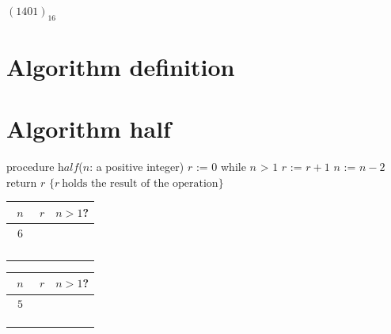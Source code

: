 \documentclass[12pt, oneside]{article}
\begin{document}
\vfill
\vfill
\vfill


$(1401)_{16}$

\vfill
\vfill
\vfill
 \vfill
\section*{Algorithm definition}


 \vfill
\section*{Algorithm half}


\begin{algorithm}[caption={Algorithm for calculating integer part of half the input}]
    procedure $\textit{half}$($n$: a positive integer)
    $r$ := $0$
    while $n$ > $1$
      $r$ := $r + 1$
      $n$ := $n - 2$
    return $r$ $\{ r~\textrm{holds the result of the operation}\} $
    \end{algorithm}

 \begin{multicols}{2}
  \begin{center} 
    \begin{tabular}{c|c|c}
    $n$ & $r$  & $n > 1$?\\
    \hline 
    ~$6$~ & \phantom{~$0$~} & \phantom{~T~}\\
    \phantom{$4$} & \phantom{$1$} & \phantom{T}\\
    \phantom{$2$} & \phantom{$2$} & \phantom{T}\\
    \phantom{$0$} & \phantom{$3$} & \phantom{F}\\
    &\\
    \end{tabular}
    \end{center}
    \begin{center}
      \begin{tabular}{c|c|c}
      $n$ & $r$  & $n > 1$?\\
      \hline 
      ~$5$~ & \phantom{~$0$~} & \phantom{~T~}\\
      \phantom{$3$} & \phantom{$1$} & \phantom{T}\\
      \phantom{$1$} & \phantom{$2$} & \phantom{F}\\
      &\\
      \end{tabular}
      \end{center}    
\end{multicols}
\end{document}
